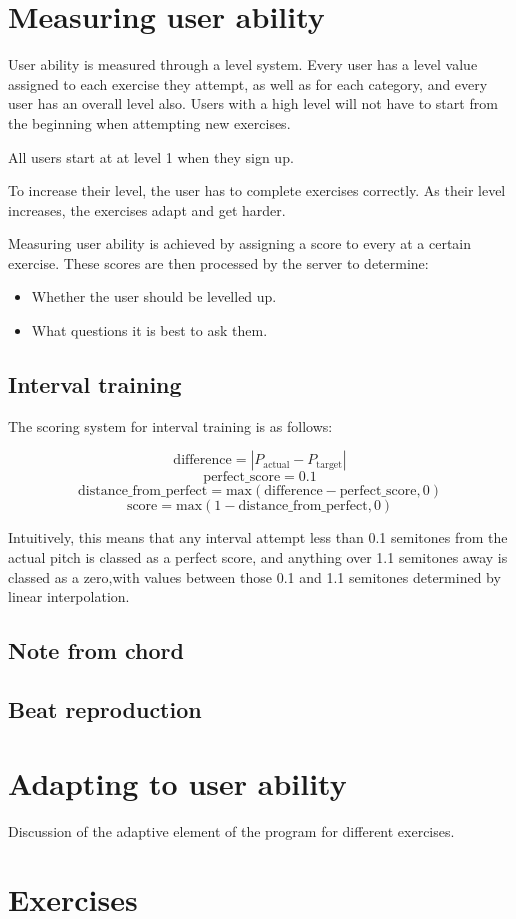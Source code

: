 \section{Measuring user ability}

User ability is measured through a level system. Every user has a level value assigned to each exercise they attempt, as well as for each category, and every user has an overall level also. Users with a high level will not have to start from the beginning when attempting new exercises. 

All users start at at level 1 when they sign up.

To increase their level, the user has to complete exercises correctly. As their level increases, the exercises adapt and get harder.

Measuring user ability is achieved by assigning a score to every  at a certain exercise. These scores are then processed by the server to determine:
	\begin{itemize}
		\item Whether the user should be levelled up.
		\item What questions it is best to ask them.
	\end{itemize}

\subsection{Interval training}

The scoring system for interval training is as follows:

\[\text{difference} = |P_\text{actual}- P_\text{target}|\]
\[\text{perfect\_score} = 0.1 \]
\[\text{distance\_from\_perfect} = \text{max}(\text{difference}-\text{perfect\_score},0)\]
\[\text{score} = \text{max}(1 - \text{distance\_from\_perfect},0)\]

Intuitively, this means that any interval attempt less than 0.1 semitones from the actual pitch is classed as a perfect score, and anything over 1.1 semitones away is classed as a zero,with values between those 0.1 and 1.1 semitones determined by linear interpolation.

\subsection{Note from chord}
\subsection{Beat reproduction}

\section{Adapting to user ability}
Discussion of the adaptive element of the program for different exercises.
\section{Exercises}

